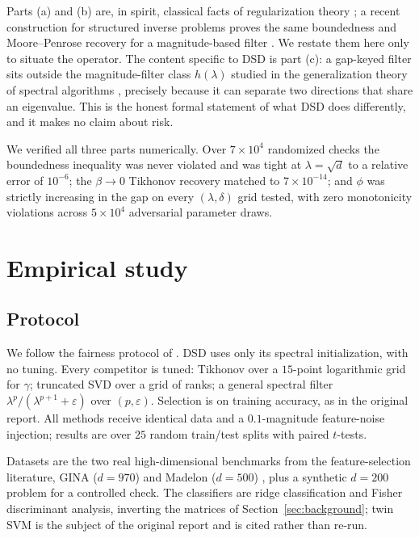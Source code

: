 \documentclass[preprint,12pt]{elsarticle}
\begin{document}
Parts (a) and (b) are, in spirit, classical facts of regularization theory
\cite{engl1996regularization}; a recent construction for structured inverse problems proves the same
boundedness and Moore--Penrose recovery for a magnitude-based filter \cite{chen2026spectral}. We
restate them here only to situate the operator. The content specific to DSD is part (c): a gap-keyed
filter sits outside the magnitude-filter class $h(\lambda)$ studied in the generalization theory of
spectral algorithms \cite{velikanov2024spectral}, precisely because it can separate two directions
that share an eigenvalue. This is the honest formal statement of what DSD does differently, and it
makes no claim about risk.

We verified all three parts numerically. Over $7\times10^{4}$ randomized checks the boundedness
inequality was never violated and was tight at $\lambda=\sqrt{d}$ to a relative error of $10^{-6}$; the
$\beta\to0$ Tikhonov recovery matched to $7\times10^{-14}$; and $\phi$ was strictly increasing in the
gap on every $(\lambda,\delta)$ grid tested, with zero monotonicity violations across $5\times10^{4}$
adversarial parameter draws.

\section{Empirical study}
\label{sec:empirical}

\subsection{Protocol}
We follow the fairness protocol of \cite{vashishtha2026dsd}. DSD uses only its spectral
initialization, with no tuning. Every competitor is tuned: Tikhonov over a $15$-point logarithmic grid
for $\gamma$; truncated SVD over a grid of ranks; a general spectral filter
$\lambda^p/(\lambda^{p+1}+\varepsilon)$ over $(p,\varepsilon)$. Selection is on training accuracy, as
in the original report. All methods receive identical data and a $0.1$-magnitude feature-noise
injection; results are over $25$ random train/test splits with paired $t$-tests.

Datasets are the two real high-dimensional benchmarks from the feature-selection literature,
GINA ($d=970$) and Madelon ($d=500$) \cite{guyon2004gina}, plus a synthetic $d=200$ problem for a
controlled check. The classifiers are ridge classification and Fisher discriminant analysis, inverting
the matrices of Section~\ref{sec:background}; twin SVM is the subject of the original report and is
cited rather than re-run.
\end{document}
